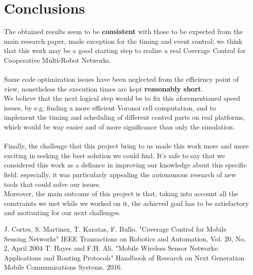 \documentclass[a4paper,11pt,oneside]{book}
\begin{document}
	
	\chapter*{Conclusions} %
	The obtained results seem to be \textbf{consistent} with those to be expected from the main research paper, made exception for the timing and event control; we think that this work may be a good starting step to realize a real Coverage Control for Cooperative Multi-Robot Networks.\\\\
	
	Some code optimization issues have been neglected from the efficiency point of view, nonetheless the execution times are kept \textbf{reasonably short}.\\
	We believe that the next logical step would be to fix this aforementioned speed issues, by e.g. finding a more efficient Voronoi cell computation, and to implement the timing and scheduling of different control parts on real platforms, which would be way easier and of more significance than only the simulation.\\\\
	
	Finally, the challenge that this project bring to us made this work more and more exciting in seeking the best solution we could find. It's safe to say that we considered this work as a defiance in improving our knowledge about this specific field: especially, it was particularly appealing the autonomous research of new tools that could solve our issues.\\
	Moreover, the main outcome of this project is that, taking into account all the constraints we met while we worked on it, the achieved goal has to be satisfactory and motivating for our next challenges.
	
	
	\begin{thebibliography}{9}             %
		
		
		
		 J. Cortes, S. Martinez, T. Karatas, F. Bullo. "Coverage Control for Mobile Sensing Networks"
		IEEE Transactions on Robotics and Automation, Vol. 20, No. 2, April 2004
		 T. Hayes and F.H. Ali. "Mobile Wireless Sensor Networks: Applications and Routing Protocols" Handbook of Research on Next Generation Mobile Communications Systems. 2016.
		
	\end{thebibliography}
	
	
\end{document}
